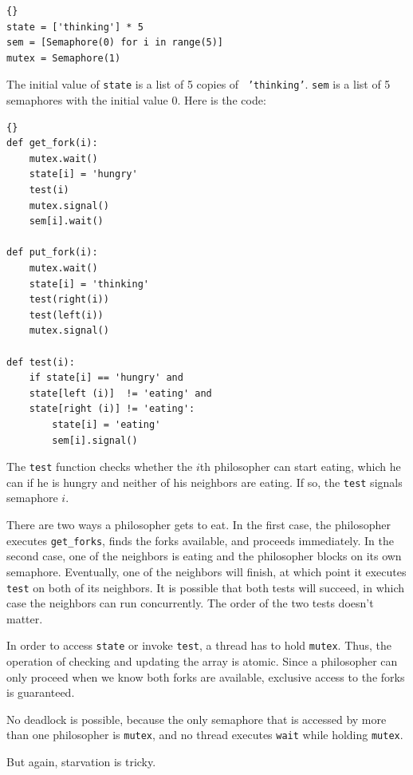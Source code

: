 \documentclass{book}
\begin{document}
\newpage
\begin{lstlisting}[title={Variables for Tanenbaum's solution}]{}
state = ['thinking'] * 5
sem = [Semaphore(0) for i in range(5)]
mutex = Semaphore(1)
\end{lstlisting}

The initial value of {\tt state} is a list of 5 copies of {\tt
        'thinking'}.  {\tt sem} is a list of 5 semaphores with the initial
value 0.  Here is the code:

\begin{lstlisting}[title={Tanenbaum's solution}]{}
def get_fork(i):
    mutex.wait()
    state[i] = 'hungry'
    test(i)
    mutex.signal()
    sem[i].wait()

def put_fork(i):
    mutex.wait()
    state[i] = 'thinking'
    test(right(i))
    test(left(i))
    mutex.signal()

def test(i):
    if state[i] == 'hungry' and
    state[left (i)]  != 'eating' and
    state[right (i)] != 'eating':
        state[i] = 'eating'
        sem[i].signal()
\end{lstlisting}


The {\tt test} function checks whether the $i$th philosopher can
start eating, which he can if he is hungry and
neither of his neighbors are eating.  If so, the {\tt test} signals
semaphore $i$.

There are two ways a philosopher gets to eat.  In the first case, the
philosopher executes {\tt get\_forks}, finds the forks available, and
proceeds immediately.  In the second case, one of the neighbors is
eating and the philosopher blocks on its own semaphore.  Eventually,
one of the neighbors will finish, at which point it executes {\tt
        test} on both of its neighbors.  It is possible that both tests
will succeed, in which case the neighbors can run concurrently.
The order of the two tests doesn't matter.

In order to access {\tt state} or invoke {\tt test}, a thread
has to hold {\tt mutex}.  Thus, the operation of checking and
updating the array is atomic.  Since a philosopher can only proceed
when we know both forks are available, exclusive access to the forks
is guaranteed.

No deadlock is possible, because the only semaphore that is accessed
by more than one philosopher is {\tt mutex}, and no thread executes
    {\tt wait} while holding {\tt mutex}.

But again, starvation is tricky.
\end{document}
